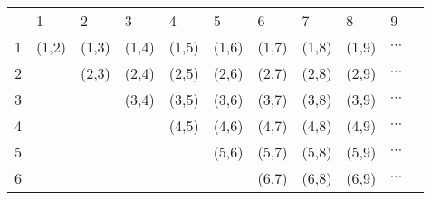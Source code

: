 \begin{table}[!htb]
	\centering
	\begin{tabular}{lllllllllll}
		& 1                             & 2                             & 3                             & 4                             & 5                             & 6                             & 7                             & 8                             & 9                                &  \\
		1 & \cellcolor[HTML]{9B9B9B}(1,2) & \cellcolor[HTML]{9B9B9B}(1,3) & \cellcolor[HTML]{C0C0C0}(1,4) & \cellcolor[HTML]{C0C0C0}(1,5) & \cellcolor[HTML]{9B9B9B}(1,6) & \cellcolor[HTML]{9B9B9B}(1,7) & \cellcolor[HTML]{9B9B9B}(1,8) & \cellcolor[HTML]{C0C0C0}(1,9) & \cellcolor[HTML]{C0C0C0}$\cdots$ &  \\
		2 &                               & \cellcolor[HTML]{9B9B9B}(2,3) & \cellcolor[HTML]{C0C0C0}(2,4) & \cellcolor[HTML]{C0C0C0}(2,5) & \cellcolor[HTML]{9B9B9B}(2,6) & \cellcolor[HTML]{9B9B9B}(2,7) & \cellcolor[HTML]{9B9B9B}(2,8) & \cellcolor[HTML]{C0C0C0}(2,9) & \cellcolor[HTML]{C0C0C0}$\cdots$ &  \\
		3 &                               &                               & \cellcolor[HTML]{C0C0C0}(3,4) & \cellcolor[HTML]{C0C0C0}(3,5) & \cellcolor[HTML]{9B9B9B}(3,6) & \cellcolor[HTML]{9B9B9B}(3,7) & \cellcolor[HTML]{9B9B9B}(3,8) & \cellcolor[HTML]{C0C0C0}(3,9) & \cellcolor[HTML]{C0C0C0}$\cdots$ &  \\
		4 &                               &                               &                               & (4,5)                         & \cellcolor[HTML]{C0C0C0}(4,6) & \cellcolor[HTML]{C0C0C0}(4,7) & \cellcolor[HTML]{C0C0C0}(4,8) & (4,9)                         & $\cdots$                         &  \\
		5 &                               &                               &                               &                               & \cellcolor[HTML]{C0C0C0}(5,6) & \cellcolor[HTML]{C0C0C0}(5,7) & \cellcolor[HTML]{C0C0C0}(5,8) & (5,9)                         & $\cdots$                         &  \\
		6 &                               &                               &                               &                               &                               & \cellcolor[HTML]{9B9B9B}(6,7) & \cellcolor[HTML]{9B9B9B}(6,8) & \cellcolor[HTML]{C0C0C0}(6,9) & \cellcolor[HTML]{C0C0C0}$\cdots$ &  \\

\end{tabular}
\end{table}
